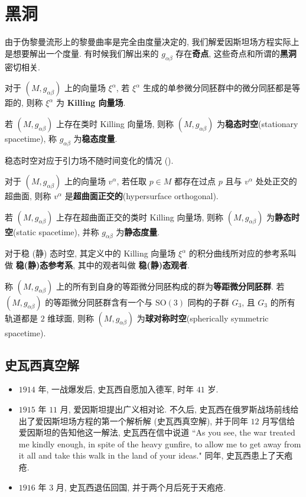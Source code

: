 \section{黑洞}
\label{blackhole}
由于伪黎曼流形上的黎曼曲率是完全由度量决定的, 我们解爱因斯坦场方程实际上是想要解出一个度量. 有时候我们解出来的 $g_{\alpha\beta}$ 存在{\bf 奇点}, 这些奇点和所谓的{\bf 黑洞}密切相关.

对于 $(M,g_{\alpha\beta})$ 上的向量场 $\xi^{\alpha}$, 若 $\xi^{\alpha}$ 生成的单参微分同胚群中的微分同胚都是等距的, 则称 $\xi^{\alpha}$ 为 {\bf Killing 向量场}.

若 $(M,g_{\alpha\beta})$ 上存在类时 Killing 向量场, 则称 $(M,g_{\alpha\beta})$ 为{\bf 稳态时空}(stationary spacetime), 称 $g_{\alpha\beta}$ 为{\bf 稳态度量}. 

\begin{remark}
	稳态时空对应于引力场不随时间变化的情况 (\cite[\S\,8.1]{梁灿彬2000微分几何入门与广义相对论}).
\end{remark}

对于 $(M,g_{\alpha\beta})$ 上的向量场 $v^{\alpha}$, 若任取 $p\in M$ 都存在过点 $p$ 且与 $v^{\alpha}$ 处处正交的超曲面, 则称 $v^{\alpha}$ 是{\bf 超曲面正交的}(hypersurface orthogonal).

若 $(M,g_{\alpha\beta})$ 上存在超曲面正交的类时 Killing 向量场, 则称 $(M,g_{\alpha\beta})$ 为{\bf 静态时空}(static spacetime), 并称 $g_{\alpha\beta}$ 为{\bf 静态度量}.

对于稳 (静) 态时空, 其定义中的 Killing 向量场 $\xi^{\alpha}$ 的积分曲线所对应的参考系叫做 {\bf 稳(静)态参考系}, 其中的观者叫做 {\bf 稳(静)态观者}.

称 $(M,g_{\alpha\beta})$ 上的所有到自身的等距微分同胚构成的群为{\bf 等距微分同胚群}. 若 $(M,g_{\alpha\beta})$ 的等距微分同胚群含有一个与 $\mathrm{SO}(3)$ 同构的子群 $G_3$, 且 $G_3$ 的所有轨道都是 $2$ 维球面, 则称 $(M,g_{\alpha\beta})$ 为{\bf 球对称时空}(spherically symmetric spacetime).

\subsection{史瓦西真空解}
\begin{itemize}
	\item $1914$ 年, 一战爆发后, 史瓦西自愿加入德军, 时年 $41$ 岁.
	\item $1915$ 年 $11$ 月, 爱因斯坦提出广义相对论. 不久后, 史瓦西在俄罗斯战场前线给出了爱因斯坦场方程的第一个解析解 (史瓦西真空解), 并于同年 $12$ 月写信给爱因斯坦的告知他这一解法, 史瓦西在信中说道 ``As you see, the war treated me kindly enough, in spite of the heavy gunfire, to allow me to get away from it all and take this walk in the land of your ideas." 同年, 史瓦西患上了天疱疮.
	\item $1916$ 年 $3$ 月, 史瓦西退伍回国, 并于两个月后死于天疱疮.
\end{itemize}

